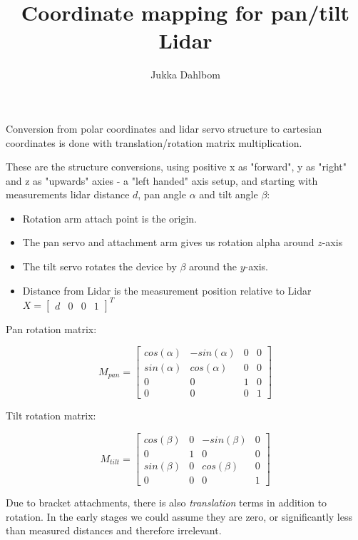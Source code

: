 \documentclass{article}
\begin{document}
\title{Coordinate mapping for pan/tilt Lidar}
\author{Jukka Dahlbom}
\maketitle


Conversion from polar coordinates and lidar servo structure
to cartesian coordinates is done with translation/rotation matrix
multiplication.
    
These are the structure conversions, using positive x as "forward", y as "right" and z as "upwards" axies - a "left handed" axis setup,
and starting with measurements lidar distance $d$, pan angle $\alpha$ and tilt angle $\beta$:
\begin{itemize}
\item Rotation arm attach point is the origin.
\item The pan servo and attachment arm gives us rotation alpha around $z$-axis
\item The tilt servo rotates the device by $\beta$ around 
the $y$-axis.
\item Distance from Lidar is the measurement position relative to Lidar $X = \begin{bmatrix}d & 0 & 0 & 1 \end{bmatrix}^T$
\end{itemize}

Pan rotation matrix:

\begin{equation}
M_{pan} =
\begin{bmatrix}
  cos(\alpha) & -sin(\alpha) &	0	& 0\\
  sin(\alpha) &	cos(\alpha)	 &  0   & 0\\
  0			  & 0			 &	1	& 0\\
  0			  &	0			 &	0	& 1
\end{bmatrix}
\end{equation}

Tilt rotation matrix:

\begin{equation}
M_{tilt} =
\begin{bmatrix}
  cos(\beta)  & 0		     &	-sin(\beta)	& 0\\
  0			  &	1			 &  0   & 0\\
  sin(\beta)  & 0			 &	cos(\beta)	& 0\\
  0			  &	0			 &	0	& 1
\end{bmatrix}
\end{equation}

Due to bracket attachments, there is also \emph{translation} 
terms in addition to rotation. 
In the early stages we could assume they 
are zero, or significantly less than measured distances and 
therefore irrelevant.
\end{document}
